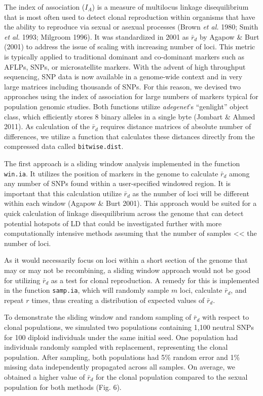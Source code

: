 \documentclass[double,12pt]{beavtex}
\begin{document}
  The index of association (\(I_A\)) is a measure of multilocus linkage
  disequilibrium that is most often used to detect clonal reproduction
  within organisms that have the ability to reproduce via sexual or
  asexual processes (Brown \emph{et al.} 1980; Smith \emph{et al.} 1993;
  Milgroom 1996). It was standardized in 2001 as \(\bar{r}_d\) by Agapow
  \& Burt (2001) to address the issue of scaling with increasing number of
  loci. This metric is typically applied to traditional dominant and
  co-dominant markers such as AFLPs, SNPs, or microsatellite markers. With
  the advent of high throughput sequencing, SNP data is now available in a
  genome-wide context and in very large matrices including thousands of
  SNPs. For this reason, we devised two approaches using the index of
  association for large numbers of markers typical for population genomic
  studies. Both functions utilize \emph{adegenet}'s ``genlight'' object
  class, which efficiently stores 8 binary alleles in a single byte
  (Jombart \& Ahmed 2011). As calculation of the \(\bar{r}_d\) requires
  distance matrices of absolute number of differences, we utilize a
  function that calculates these distances directly from the compressed
  data called \texttt{bitwise.dist}.
  
  The first approach is a sliding window analysis implemented in the
  function \texttt{win.ia}. It utilizes the position of markers in the
  genome to calculate \(\bar{r}_d\) among any number of SNPs found within
  a user-specified windowed region. It is important that this calculation
  utilize \(\bar{r}_d\) as the number of loci will be different within
  each window (Agapow \& Burt 2001). This approach would be suited for a
  quick calculation of linkage disequilibrium across the genome that can
  detect potential hotspots of LD that could be investigated further with
  more computationally intensive methods assuming that the number of
  samples \textless{}\textless{} the number of loci.
  
  As it would necessarily focus on loci within a short section of the
  genome that may or may not be recombining, a sliding window approach
  would not be good for utilizing \(\bar{r}_d\) as a test for clonal
  reproduction. A remedy for this is implemented in the function
  \texttt{samp.ia}, which will randomly sample \(m\) loci, calculate
  \(\bar{r}_d\), and repeat \(r\) times, thus creating a distribution of
  expected values of \(\bar{r}_d\).
  
  To demonstrate the sliding window and random sampling of \(\bar{r}_d\)
  with respect to clonal populations, we simulated two populations
  containing 1,100 neutral SNPs for 100 diploid individuals under the same
  initial seed. One population had individuals randomly sampled with
  replacement, representing the clonal population. After sampling, both
  populations had 5\% random error and 1\% missing data independently
  propagated across all samples. On average, we obtained a higher value of
  \(\bar{r}_d\) for the clonal population compared to the sexual
  population for both methods (Fig. 6).
  
\end{document}
